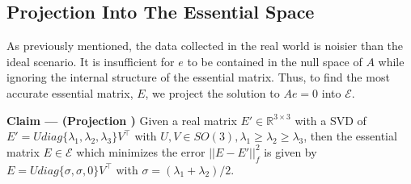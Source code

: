 \documentclass{article}
\begin{document}
\subsection{Projection Into The Essential Space }

As previously mentioned, the data collected in the real world is noisier than the ideal scenario. It is insufficient for $e$ to be contained in the null space of $A$ while ignoring the internal structure of the essential matrix. Thus, to find the most accurate essential matrix, $E$, we project the solution to $Ae=0$ into $\mathcal{E}$. 

\begin{tcolorbox}[enhanced,breakable,sharp corners, colback=green!5!white, colframe=green!55!black, boxrule=0mm,top=0mm,bottom=0mm,leftrule=1mm]
    {\color{green!55!black} \textbf{Claim --- (Projection )}} Given a real matrix $E' \in \mathbb{R}^{3\times3}$ with a SVD of $E' = Udiag\{\lambda_1, \lambda_2, \lambda_3\}V^\top$ with $U, V \in SO(3), \lambda_1 \geq \lambda_2 \geq \lambda_3$, then the essential matrix $E\in\mathcal{E}$ which minimizes the error $||E-E'||^2_f$ is given by $E=Udiag\{\sigma, \sigma, 0\}V^\top$ with $\sigma = (\lambda_1 + \lambda_2)/2$.
\end{tcolorbox}
\end{document}
